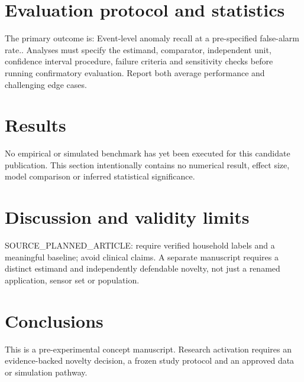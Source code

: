 \documentclass[11pt,a4paper]{article}
\begin{document}
\section{Evaluation protocol and statistics}
The primary outcome is: Event-level anomaly recall at a pre-specified false-alarm rate.. Analyses must specify the estimand, comparator, independent unit, confidence interval procedure, failure criteria and sensitivity checks before running confirmatory evaluation. Report both average performance and challenging edge cases.
\section{Results}
No empirical or simulated benchmark has yet been executed for this candidate publication. This section intentionally contains no numerical result, effect size, model comparison or inferred statistical significance.
\section{Discussion and validity limits}
SOURCE\_PLANNED\_ARTICLE: require verified household labels and a meaningful baseline; avoid clinical claims. A separate manuscript requires a distinct estimand and independently defendable novelty, not just a renamed application, sensor set or population.
\section{Conclusions}
This is a pre-experimental concept manuscript. Research activation requires an evidence-backed novelty decision, a frozen study protocol and an approved data or simulation pathway.
\end{document}
